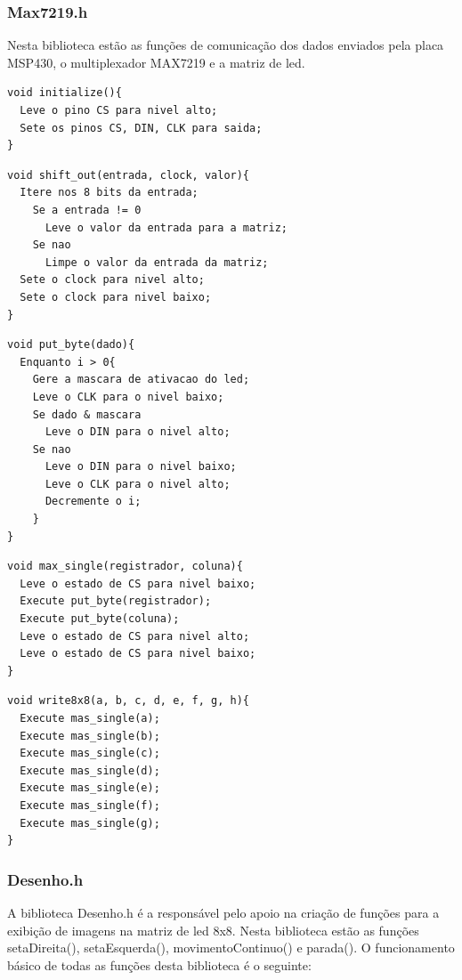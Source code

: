 \documentclass[conference]{IEEEtran}
\begin{document}
\subsubsection{Max7219.h}
Nesta biblioteca estão as funções de comunicação dos dados enviados pela placa MSP430, o multiplexador MAX7219 e a matriz de led.
\begin{lstlisting}
void initialize(){
  Leve o pino CS para nivel alto;
  Sete os pinos CS, DIN, CLK para saida;
}
\end{lstlisting}

\begin{lstlisting}
void shift_out(entrada, clock, valor){
  Itere nos 8 bits da entrada;
    Se a entrada != 0
      Leve o valor da entrada para a matriz;
    Se nao
      Limpe o valor da entrada da matriz;
  Sete o clock para nivel alto;
  Sete o clock para nivel baixo; 
}
\end{lstlisting}

\begin{lstlisting}
void put_byte(dado){
  Enquanto i > 0{
	Gere a mascara de ativacao do led;
	Leve o CLK para o nivel baixo;
	Se dado & mascara
	  Leve o DIN para o nivel alto;
	Se nao
	  Leve o DIN para o nivel baixo;
	  Leve o CLK para o nivel alto;
	  Decremente o i;	
	}
}
\end{lstlisting}

\begin{lstlisting}
void max_single(registrador, coluna){
  Leve o estado de CS para nivel baixo;
  Execute put_byte(registrador);
  Execute put_byte(coluna);
  Leve o estado de CS para nivel alto;
  Leve o estado de CS para nivel baixo;
}
\end{lstlisting}

\begin{lstlisting}
void write8x8(a, b, c, d, e, f, g, h){
  Execute mas_single(a);
  Execute mas_single(b);
  Execute mas_single(c);
  Execute mas_single(d);
  Execute mas_single(e);
  Execute mas_single(f);
  Execute mas_single(g);
}
\end{lstlisting}

\subsubsection{Desenho.h}
A biblioteca Desenho.h é a responsável pelo apoio na criação de funções para a exibição de imagens na matriz de led 8x8. Nesta biblioteca estão as funções setaDireita(), setaEsquerda(), movimentoContinuo() e parada(). O funcionamento básico de todas as funções desta biblioteca é o seguinte:
\end{document}
